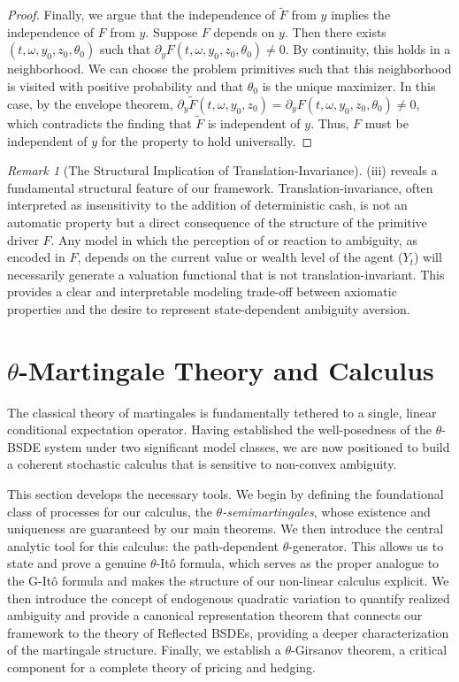 \documentclass[12pt, letterpaper]{amsart}
\theoremstyle{plain}
\theoremstyle{definition}
\theoremstyle{remark}
\newtheorem{remark}[theorem]{Remark}
\numberwithin{equation}{section} %
\begin{document}
\begin{proof}
Finally, we argue that the independence of $\tilde{F}$ from $y$ implies the independence of $F$ from $y$. Suppose $F$ depends on $y$. Then there exists $(t,\omega,y_0,z_0,\theta_0)$ such that $\partial_y F(t,\omega,y_0,z_0,\theta_0) \neq 0$. By continuity, this holds in a neighborhood. We can choose the problem primitives such that this neighborhood is visited with positive probability and that $\theta_0$ is the unique maximizer. In this case, by the envelope theorem, $\partial_y \tilde{F}(t,\omega,y_0,z_0) = \partial_y F(t,\omega,y_0,z_0,\theta_0) \neq 0$, which contradicts the finding that $\tilde{F}$ is independent of $y$. Thus, $F$ must be independent of $y$ for the property to hold universally.
\end{proof}

\begin{remark}[The Structural Implication of Translation-Invariance]
(iii) reveals a fundamental structural feature of our framework. Translation-invariance, often interpreted as insensitivity to the addition of deterministic cash, is not an automatic property but a direct consequence of the structure of the primitive driver $F$. Any model in which the perception of or reaction to ambiguity, as encoded in $F$, depends on the current value or wealth level of the agent ($Y_t$) will necessarily generate a valuation functional that is not translation-invariant. This provides a clear and interpretable modeling trade-off between axiomatic properties and the desire to represent state-dependent ambiguity aversion.
\end{remark}

\section{\texorpdfstring{$\theta$}{theta}-Martingale Theory and Calculus}
\label{sec:martingales_revised}

The classical theory of martingales is fundamentally tethered to a single, linear conditional expectation operator. Having established the well-posedness of the \(\theta\)-BSDE system under two significant model classes, we are now positioned to build a coherent stochastic calculus that is sensitive to non-convex ambiguity.

This section develops the necessary tools. We begin by defining the foundational class of processes for our calculus, the \emph{\(\theta\)-semimartingales}, whose existence and uniqueness are guaranteed by our main theorems. We then introduce the central analytic tool for this calculus: the path-dependent \(\theta\)-generator. This allows us to state and prove a genuine \(\theta\)-Itô formula, which serves as the proper analogue to the G-Itô formula and makes the structure of our non-linear calculus explicit. We then introduce the concept of endogenous quadratic variation to quantify realized ambiguity and provide a canonical representation theorem that connects our framework to the theory of Reflected BSDEs, providing a deeper characterization of the martingale structure. Finally, we establish a $\theta$-Girsanov theorem, a critical component for a complete theory of pricing and hedging.
\end{document}

